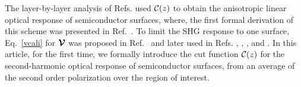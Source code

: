 \documentclass[floatfix,prb,aps,superscriptaddress,showpacs,11pt,preprint,letterpaper]{revtex4}
\begin{document}
The layer-by-layer analysis of Refs.   
used ${\mathbf{\cal C}}(z)$
to obtain the  
anisotropic linear optical response of semiconductor surfaces, 
where, the first formal derivation  
of this scheme  
was presented in  
Ref.~. 
To limit the SHG response to one surface, Eq.~\eqref{vcali} 
for $\boldsymbol{\mathcal{\cal V}}$ was proposed in 
Ref.~ and later used in Refs.
,
,
,
 and . 
In this article, for the first time, we formally introduce the cut function ${\mathbf{\cal C}}(z)$ 
for the second-harmonic optical response of semiconductor surfaces,
from an average of the second order polarization over the region of interest.
\end{document}

